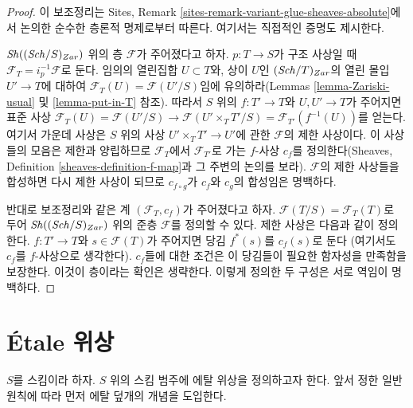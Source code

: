 \begin{proof}
이 보조정리는 Sites, Remark
\ref{sites-remark-variant-glue-sheaves-absolute}에서 논의한 순수한
층론적 명제로부터 따른다. 여기서는 직접적인 증명도 제시한다.

\medskip\noindent
$\mathop{\mathit{Sh}}\nolimits((\mathit{Sch}/S)_{Zar})$ 위의 층 $\mathcal{F}$가 주어졌다고 하자.
$p : T \to S$가 구조 사상일 때
$\mathcal{F}_T = i_p^{-1}\mathcal{F}$로 둔다. 임의의 열린집합
$U \subset T$와, 상이 $U$인 $(\mathit{Sch}/T)_{Zar}$의 열린 몰입
$U' \to T$에 대하여
$\mathcal{F}_T(U) = \mathcal{F}(U'/S)$임에 유의하라(Lemmas
\ref{lemma-Zariski-usual} 및 \ref{lemma-put-in-T} 참조). 따라서 $S$ 위의
$f : T' \to T$와 $U, U' \to T$가 주어지면 표준 사상
$\mathcal{F}_T(U) = \mathcal{F}(U'/S) \to \mathcal{F}(U'\times_T T'/S)
= \mathcal{F}_{T'}(f^{-1}(U))$를 얻는다. 여기서 가운데 사상은 $S$ 위의
사상 $U' \times_T T' \to U'$에 관한 $\mathcal{F}$의 제한 사상이다.
이 사상들의 모음은 제한과 양립하므로 $\mathcal{F}_T$에서
$\mathcal{F}_{T'}$로 가는 $f$-사상 $c_f$를 정의한다(Sheaves,
Definition \ref{sheaves-definition-f-map}과 그 주변의 논의를 보라).
$\mathcal{F}$의 제한 사상들을 합성하면 다시 제한 사상이 되므로
$c_{f \circ g}$가 $c_f$와 $c_g$의 합성임은 명백하다.

\medskip\noindent
반대로 보조정리와 같은 계 $(\mathcal{F}_T, c_f)$가 주어졌다고 하자.
$\mathcal{F}(T/S) = \mathcal{F}_T(T)$로 두어
$\mathop{\mathit{Sh}}\nolimits((\mathit{Sch}/S)_{Zar})$ 위의 준층 $\mathcal{F}$를 정의할 수 있다.
제한 사상은 다음과 같이 정의한다. $f : T' \to T$와
$s \in \mathcal{F}(T)$가 주어지면 당김 $f^*(s)$를 $c_f(s)$로 둔다
(여기서도 $c_f$를 $f$-사상으로 생각한다). $c_f$들에 대한 조건은 이
당김들이 필요한 함자성을 만족함을 보장한다. 이것이 층이라는 확인은
생략한다. 이렇게 정의한 두 구성은 서로 역임이 명백하다.
\end{proof}























\section{\'Etale 위상}
\label{section-etale}

\noindent
$S$를 스킴이라 하자. $S$ 위의 스킴 범주에 에탈 위상을 정의하고자
한다. 앞서 정한 일반 원칙에 따라 먼저 에탈 덮개의 개념을 도입한다.

